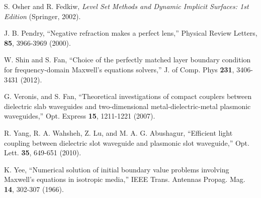 \begin{thebibliography}{99}
 S. Osher and R. Fedkiw, \emph{Level Set Methods and Dynamic Implicit Surfaces: 1st Edition} (Springer, 2002).

 J. B. Pendry, ``Negative refraction makes a perfect lens,''
    Physical Review Letters, \textbf{85}, 3966-3969 (2000).

 W. Shin and S. Fan, ``Choice of the perfectly matched layer boundary condition for frequency-domain Maxwell’s equations solvers,''
    J. of Comp. Phys \textbf{231}, 3406-3431 (2012).
 
 G. Veronis, and S. Fan, 
    ``Theoretical investigations of compact couplers between dielectric slab 
    waveguides and two-dimensional metal-dielectric-metal plasmonic waveguides,'' 
    Opt. Express \textbf{15}, 1211-1221 (2007).

 R. Yang, R. A. Wahsheh, Z. Lu, and M. A. G. Abushagur, 
    ``Efficient light coupling between dielectric slot waveguide and plasmonic
    slot waveguide,'' Opt. Lett. \textbf{35}, 649-651 (2010).

 K. Yee, ``Numerical solution of initial boundary value problems involving Maxwell’s equations in isotropic media,'' IEEE Trans. Antennas Propag. Mag. \textbf{14}, 302-307 (1966).


\end{thebibliography}
